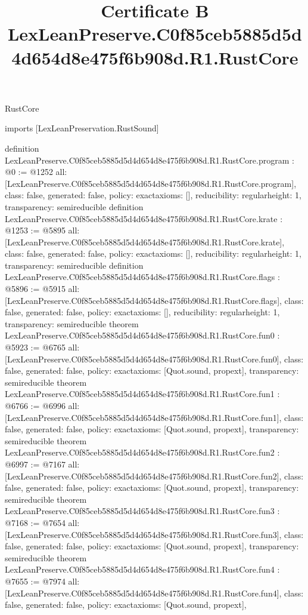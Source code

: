 \begin{lexlean}{RustCore}
\title{Certificate B LexLeanPreserve.C0f85ceb5885d5d4d654d8e475f6b908d.R1.RustCore}
\begin{coremodule}
imports [LexLeanPreservation.RustSound]

definition LexLeanPreserve.C0f85ceb5885d5d4d654d8e475f6b908d.R1.RustCore.program : @0 := @1252 {
  all: [LexLeanPreserve.C0f85ceb5885d5d4d654d8e475f6b908d.R1.RustCore.program],
  class: false,
  generated: false,
  policy: exact{axioms: []},
  reducibility: regular{height: 1},
  transparency: semireducible
}
definition LexLeanPreserve.C0f85ceb5885d5d4d654d8e475f6b908d.R1.RustCore.krate : @1253 := @5895 {
  all: [LexLeanPreserve.C0f85ceb5885d5d4d654d8e475f6b908d.R1.RustCore.krate],
  class: false,
  generated: false,
  policy: exact{axioms: []},
  reducibility: regular{height: 1},
  transparency: semireducible
}
definition LexLeanPreserve.C0f85ceb5885d5d4d654d8e475f6b908d.R1.RustCore.flags : @5896 := @5915 {
  all: [LexLeanPreserve.C0f85ceb5885d5d4d654d8e475f6b908d.R1.RustCore.flags],
  class: false,
  generated: false,
  policy: exact{axioms: []},
  reducibility: regular{height: 1},
  transparency: semireducible
}
theorem LexLeanPreserve.C0f85ceb5885d5d4d654d8e475f6b908d.R1.RustCore.fun0 : @5923 := @6765 {
  all: [LexLeanPreserve.C0f85ceb5885d5d4d654d8e475f6b908d.R1.RustCore.fun0],
  class: false,
  generated: false,
  policy: exact{axioms: [Quot.sound, propext]},
  transparency: semireducible
}
theorem LexLeanPreserve.C0f85ceb5885d5d4d654d8e475f6b908d.R1.RustCore.fun1 : @6766 := @6996 {
  all: [LexLeanPreserve.C0f85ceb5885d5d4d654d8e475f6b908d.R1.RustCore.fun1],
  class: false,
  generated: false,
  policy: exact{axioms: [Quot.sound, propext]},
  transparency: semireducible
}
theorem LexLeanPreserve.C0f85ceb5885d5d4d654d8e475f6b908d.R1.RustCore.fun2 : @6997 := @7167 {
  all: [LexLeanPreserve.C0f85ceb5885d5d4d654d8e475f6b908d.R1.RustCore.fun2],
  class: false,
  generated: false,
  policy: exact{axioms: [Quot.sound, propext]},
  transparency: semireducible
}
theorem LexLeanPreserve.C0f85ceb5885d5d4d654d8e475f6b908d.R1.RustCore.fun3 : @7168 := @7654 {
  all: [LexLeanPreserve.C0f85ceb5885d5d4d654d8e475f6b908d.R1.RustCore.fun3],
  class: false,
  generated: false,
  policy: exact{axioms: [Quot.sound, propext]},
  transparency: semireducible
}
theorem LexLeanPreserve.C0f85ceb5885d5d4d654d8e475f6b908d.R1.RustCore.fun4 : @7655 := @7974 {
  all: [LexLeanPreserve.C0f85ceb5885d5d4d654d8e475f6b908d.R1.RustCore.fun4],
  class: false,
  generated: false,
  policy: exact{axioms: [Quot.sound, propext]},
}
\end{coremodule}
\end{lexlean}
